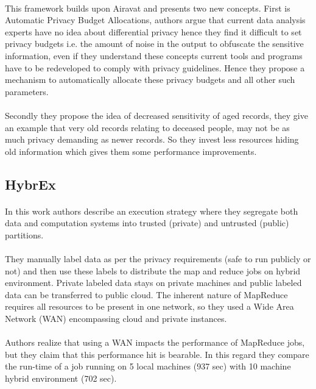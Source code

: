 \documentclass{report}
\begin{document}
\paragraph{}
This framework \cite{mohan2012gupt} builds upon Airavat \cite{roy2010airavat} and presents two new concepts. First is Automatic Privacy Budget Allocations, authors argue that current data analysis experts have no idea about differential privacy hence they find it difficult to set privacy budgets i.e. the amount of noise in the output to obfuscate the sensitive information, even if they understand these concepts current tools and programs have to be redeveloped to comply with privacy guidelines. Hence they propose a mechanism to automatically allocate these privacy budgets and all other such parameters.
\paragraph{}
Secondly they propose the idea of decreased sensitivity of aged records, they give an example that very old records relating to deceased people, may not be as much privacy demanding as newer records. So they invest less resources hiding old information which gives them some performance improvements.
\subsection{HybrEx}
\paragraph{}
In this work \cite{ko2011hybrex} authors describe an execution strategy where they segregate both data and computation systems into trusted (private) and untrusted (public) partitions.
\paragraph{}
They manually label data as per the privacy requirements (safe to run publicly or not) and then use these labels to distribute the map and reduce jobs on hybrid environment. Private labeled data stays on private machines and public labeled data can be transferred to public cloud. The inherent nature of MapReduce requires all resources to be present in one network, so they used a Wide Area Network (WAN) encompassing cloud and private instances.
\paragraph{}
Authors realize that using a WAN impacts the performance of MapReduce jobs, but they claim that this performance hit is bearable. In this regard they compare the run-time of a job running on 5 local machines (937 sec) with 10 machine hybrid environment (702 sec).
\end{document}
